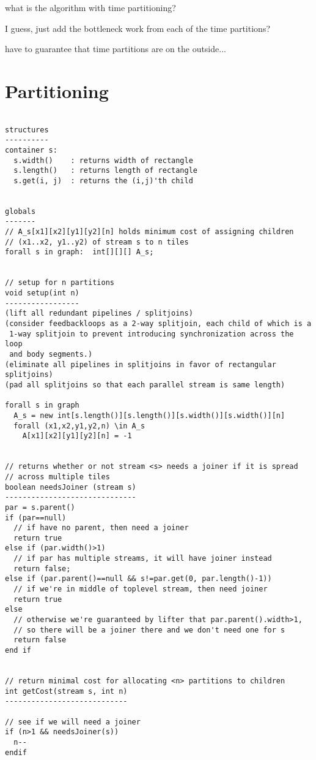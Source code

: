 what is the algorithm with time partitioning?

I guess, just add the bottleneck work from each of the time
partitions?

have to guarantee that time partitions are on the outside...


\section{Partitioning}

\scriptsize
\begin{verbatim}

structures
----------
container s:
  s.width()    : returns width of rectangle
  s.length()   : returns length of rectangle
  s.get(i, j)  : returns the (i,j)'th child


globals
-------
// A_s[x1][x2][y1][y2][n] holds minimum cost of assigning children 
// (x1..x2, y1..y2) of stream s to n tiles
forall s in graph:  int[][][] A_s;


// setup for n partitions
void setup(int n) 
-----------------
(lift all redundant pipelines / splitjoins)
(consider feedbackloops as a 2-way splitjoin, each child of which is a
 1-way splitjoin to prevent introducing synchronization across the loop
 and body segments.)
(eliminate all pipelines in splitjoins in favor of rectangular splitjoins)
(pad all splitjoins so that each parallel stream is same length)

forall s in graph
  A_s = new int[s.length()][s.length()][s.width()][s.width()][n]
  forall (x1,x2,y1,y2,n) \in A_s
    A[x1][x2][y1][y2][n] = -1


// returns whether or not stream <s> needs a joiner if it is spread
// across multiple tiles
boolean needsJoiner (stream s)
------------------------------
par = s.parent()
if (par==null)
  // if have no parent, then need a joiner
  return true
else if (par.width()>1)
  // if par has multiple streams, it will have joiner instead
  return false;
else if (par.parent()==null && s!=par.get(0, par.length()-1))
  // if we're in middle of toplevel stream, then need joiner
  return true
else
  // otherwise we're guaranteed by lifter that par.parent().width>1,
  // so there will be a joiner there and we don't need one for s
  return false
end if


// return minimal cost for allocating <n> partitions to children
int getCost(stream s, int n)
----------------------------

// see if we will need a joiner
if (n>1 && needsJoiner(s)) 
  n--
endif


\end{verbatim}
